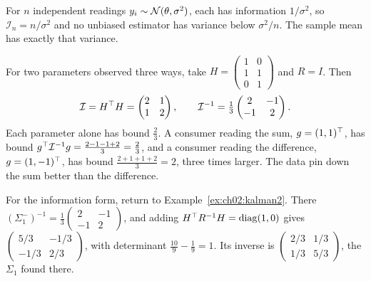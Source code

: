 \begin{example}\label{ex:ch02:fisher}
For $n$ independent readings $y_i\sim\mathcal{N}(\theta,\sigma^2)$, each has
information $1/\sigma^2$, so $\mathcal I_n=n/\sigma^2$ and no unbiased
estimator has variance below $\sigma^2/n$. The sample mean has exactly that
variance.

For two parameters observed three ways, take
$H=\begin{pmatrix}1&0\\1&1\\0&1\end{pmatrix}$ and $R=I$. Then
\[
\mathcal I=H^{\top} H=\begin{pmatrix}2&1\\1&2\end{pmatrix},\qquad
\mathcal I^{-1}=\tfrac13\begin{pmatrix}2&-1\\-1&2\end{pmatrix}.
\]
Each parameter alone has bound $\tfrac23$. A consumer reading the sum,
$g=(1,1)^{\top}$, has bound $g^{\top}\mathcal I^{-1}g=\tfrac{2-1-1+2}3=\tfrac23$, and a
consumer reading the difference, $g=(1,-1)^{\top}$, has bound
$\tfrac{2+1+1+2}3=2$, three times larger. The data pin down the sum better than
the difference.

For the information form, return to Example~\ref{ex:ch02:kalman2}. There
$(\Sigma_1^-)^{-1}=\tfrac13\begin{pmatrix}2&-1\\-1&2\end{pmatrix}$, and adding
$H^{\top} R^{-1}H=\operatorname{diag}(1,0)$ gives $\begin{pmatrix}5/3&-1/3\\-1/3&2/3\end{pmatrix}$,
with determinant $\tfrac{10}9-\tfrac19=1$. Its inverse is
$\begin{pmatrix}2/3&1/3\\1/3&5/3\end{pmatrix}$, the $\Sigma_1$ found there.
\end{example}


